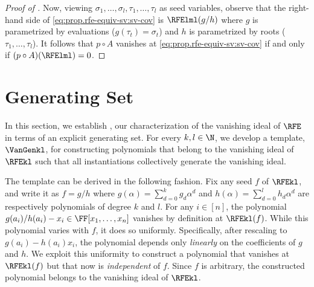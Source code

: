 \documentclass{toc}
\begin{document}
\begin{proof}[Proof of ]
  Now, viewing \(\sigma_1,\ldots,\sigma_l, \tau_1,\ldots,\tau_l\) as
  seed variables,
  observe that the right-hand side of \eqref{eq:prop.rfe-equiv-sv:sv-cov}
  is \(\RFElml(g/h)\)
  where
  \(g\) is parametrized by evaluations (\(g(\tau_t)=\sigma_t\))
  and
  \(h\) is parametrized by roots (\(\tau_1,\ldots,\tau_l\)).
  It follows that \(p\circ A\) vanishes at
  \eqref{eq:prop.rfe-equiv-sv:sv-cov} if and only if \((p\circ A)(\RFElml)
  = 0\).
\end{proof}

\section{Generating Set}
\label{s.gens}

In this section,
we establish ,
our characterization of the vanishing ideal of $\RFE$ in terms of an explicit
generating set.
For every $k,l \in \N$,
we develop a template, $\VanGenkl$, for constructing polynomials that belong
to the vanishing ideal of $\RFEkl$
such that all instantiations collectively generate the vanishing ideal.

The template can be derived in the following fashion.
Fix any seed \(f\) of \(\RFEkl\),
and write it as \(f = g/h\)
where \(g(\alpha) = \sum_{d=0}^k g_d \alpha^d\) and
\(h(\alpha) = \sum_{d=0}^l h_d \alpha^d\) are respectively polynomials of
degree \(k\) and \(l\).
For any \(i \in [n]\),
the polynomial \(g(a_i)/h(a_i) - x_i \in \FF[x_1,\ldots,x_n]\) vanishes by
definition at \(\RFEkl(f)\).
While this polynomial varies with \(f\),
it does so uniformly.
Specifically,
after rescaling to \(g(a_i) - h(a_i)x_i\),
the polynomial depends only \emph{linearly} on the coefficients of \(g\) and
\(h\).
We exploit this uniformity to construct a polynomial
that vanishes at \(\RFEkl(f)\)
but that now is \emph{independent} of \(f\).
Since \(f\) is arbitrary,
the constructed polynomial belongs to the vanishing ideal of \(\RFEkl\).
\end{document}
